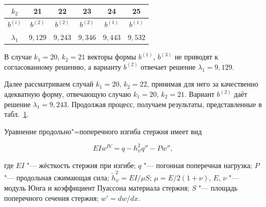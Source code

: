 \begin{table}

\centering

\small

\caption{\bf } \vspace{-3mm}

\centering

\begin{tabular}{c|c|c|c|c|c}

\hline

$k_2$ & 21 & 22 & 23 & 24 & 25 \\ \hline

$b^{(i)}$ & $b^{(2)}$ & $b^{(2)}$ & $b^{(2)}$ & $b^{(1)}$ & $b^{(1)}$ \\\hline

$\lambda_1$& $9,129$ & $9,243$ & $9,346$ & $9,443$ & $9,532$ \\ \hline

\end{tabular}

\label{table:odin}

\end{table}





\noindent В случае $k_1=20$, $k_2=21$ векторы формы $b^{(1)}$, $b^{(3)}$ не приводят к согласованному решению, а варианту $b^{(2)}$ отвечает решение $\lambda_1=9,129$.

Далее рассматриваем случай $k_1=20$, $k_2=22$, принимая для него за качественно адекватную форму, отвечающую случаю $k_1=20$, $k_2=21$. Вариант $b^{(2)}$ даёт решение $\lambda_1=9,243$. Продолжая процесс, получаем результаты, представленные в табл.~\ref{table:odin}.





\smallskip






Уравнение продольно"=поперечного изгиба стержня имеет вид \cite{mich-3}

\begin{equation}\label{odin:shestnadzyat}

EIw^{IV}=q-h_{\psi}^2q''-Pw'', 

\end{equation}

где $EI$ "--- жёсткость стержня при изгибе; $q$ "--- погонная поперечная нагрузка; $P$ "--- продольная сжимающая сила; $\tilde{h}_{\psi}^2=EI/\mu S$; $\mu=E/2(1+\nu)$, $E$, $\nu$ "--- модуль Юнга и коэффициент Пуассона материала стержня; $S$ "--- площадь поперечного сечения стержня; $w'=dw/dx$.



